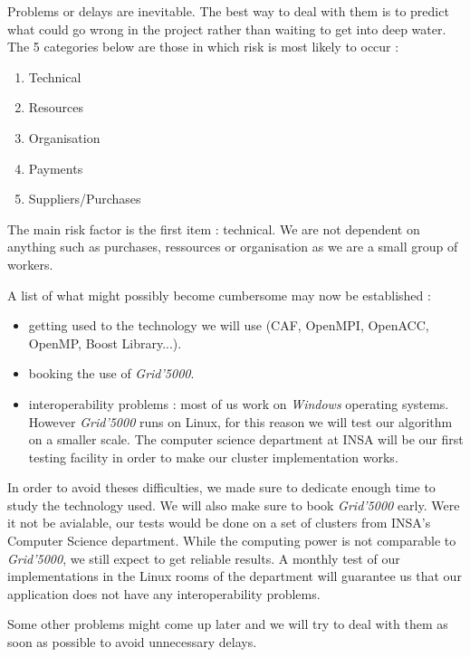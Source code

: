 Problems or delays are inevitable. The best way to deal with them is to predict what could go wrong in the project rather than waiting to get into deep water. The 5 categories below are those in which risk is most likely to occur :
\begin{enumerate}
	\item Technical
	\item Resources
	\item Organisation
	\item Payments
	\item Suppliers/Purchases
\end{enumerate}
The main risk factor is the first item : technical. We are not dependent on anything such as purchases, ressources or organisation as we are a small group of workers.

A list of what might possibly become cumbersome may now be established 	:
\begin{itemize}
	\item getting used to the technology we will use (CAF, OpenMPI, OpenACC, OpenMP, Boost Library...).
	\item booking the use of \textit{Grid'5000}.
	\item interoperability problems : most of us work on \textit{Windows} operating systems. However \textit{Grid'5000} runs on Linux, for this reason we will test our algorithm on a smaller scale. The computer science department at INSA will be our first testing facility in order to make our cluster implementation works.
\end{itemize}
In order to avoid theses difficulties, we made sure to dedicate enough time to study the technology used. We will also make sure to book \textit{Grid'5000} early. Were it not be avialable, our tests would be done on a set of clusters from INSA's Computer Science department. While the computing power is not comparable to \textit{Grid'5000}, we still expect to get reliable results. A monthly test of our implementations in the Linux rooms of the department will guarantee us that our application does not have any interoperability problems.

Some other problems might come up later and we will try to deal with them as soon as possible to avoid unnecessary delays.~\\
